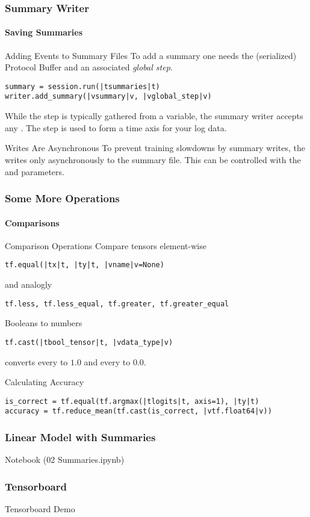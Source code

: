 \begin{frame}[fragile]
	\frametitle{Summary Writer}
	\framesubtitle{Saving Summaries}
	\begin{block}{Adding Events to Summary Files}
	To add a summary one needs the (serialized) Protocol Buffer and an associated \emph{global step}. 
	\begin{lstlisting}
summary = session.run(|tsummaries|t)
writer.add_summary(|vsummary|v, |vglobal_step|v)
	\end{lstlisting}
	While the step is typically gathered from a  variable, the summary writer accepts 
	any . The step is used to form a time axis for your log data.
	\end{block}
	\begin{block}{Writes Are Asynchronous}
	To prevent training slowdowns by summary writes, the  writes only asynchronously to 
	the summary file. This can be controlled with the  and  parameters.
	\end{block}
\end{frame}

\begin{frame}[fragile]
    \frametitle{Some More Operations}
    \framesubtitle{Comparisons}
    \begin{block}{Comparison Operations}
    Compare tensors element-wise
    \begin{lstlisting}  
tf.equal(|tx|t, |ty|t, |vname|v=None)
    \end{lstlisting}
    and analogly
    \begin{lstlisting}  
tf.less, tf.less_equal, tf.greater, tf.greater_equal
    \end{lstlisting}
    \pause
    Booleans to numbers
    \begin{lstlisting}
tf.cast(|tbool_tensor|t, |vdata_type|v)
    \end{lstlisting}
    converts every  to $1.0$ and every  to $0.0$.    	
    \end{block}
	\begin{block}{Calculating Accuracy}
	\begin{lstlisting}
is_correct = tf.equal(tf.argmax(|tlogits|t, axis=1), |ty|t)
accuracy = tf.reduce_mean(tf.cast(is_correct, |vtf.float64|v))
    \end{lstlisting}
	\end{block}
\end{frame}

\begin{frame}[fragile]
	\frametitle{Linear Model with Summaries}
	\centering Notebook (02 Summaries.ipynb)
\end{frame}

\begin{frame}[fragile]
	\frametitle{Tensorboard}
	\centering
	Tensorboard Demo
\end{frame}
